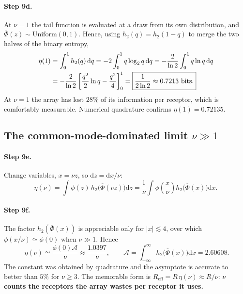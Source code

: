 \documentclass[11pt,a4paper]{article}
\newcommand{\Phibar}{\overline{\Phi}}
\newcommand{\htwo}{h_2}
\begin{document}
\paragraph{Step 9d.} At $\nu=1$ the tail function is evaluated at a draw from its own
distribution, and $\Phibar(z)\sim\mathrm{Uniform}(0,1)$. Hence, using
$\htwo(q)=\htwo(1-q)$ to merge the two halves of the binary entropy,
\begin{align}
  \eta(1)&=\int_0^1\htwo(q)\,\mathrm{d}q
         =-2\int_0^1 q\log_2 q\,\mathrm{d}q
         =-\frac{2}{\ln2}\int_0^1 q\ln q\,\mathrm{d}q \notag\\
         &=-\frac{2}{\ln2}\left[\frac{q^2}{2}\ln q-\frac{q^2}{4}\right]_0^1
          =\boxed{\frac{1}{2\ln2}\approx0.7213\ \text{bits}.}
  \label{eq:nu1}
\end{align}
At $\nu=1$ the array has lost $28\%$ of its information per receptor, which is
comfortably measurable. Numerical quadrature confirms $\eta(1)=0.72135$.

\subsection{The common-mode-dominated limit $\nu\gg1$}

\paragraph{Step 9e.} Change variables, $x=\nu z$, so $\mathrm{d}z=\mathrm{d}x/\nu$:
\begin{equation}
  \eta(\nu)=\int\phi(z)\,\htwo\big(\Phibar(\nu z)\big)\mathrm{d}z
           =\frac1\nu\int\phi\!\left(\frac{x}{\nu}\right)\htwo\big(\Phibar(x)\big)\mathrm{d}x .
\end{equation}

\paragraph{Step 9f.} The factor $\htwo(\Phibar(x))$ is appreciable only for
$|x|\lesssim4$, over which $\phi(x/\nu)\simeq\phi(0)$ when $\nu\gg1$. Hence
\begin{equation}
  \boxed{\;\eta(\nu)\simeq\frac{\phi(0)\mathcal{A}}{\nu}\approx\frac{1.0397}{\nu},
  \qquad
  \mathcal{A}=\int_{-\infty}^{\infty}\htwo\big(\Phibar(x)\big)\mathrm{d}x=2.60608 . }
  \label{eq:largenu}
\end{equation}
The constant was obtained by quadrature and the asymptote is accurate to better than
$5\%$ for $\nu\ge3$. The memorable form is $R_{\mathrm{eff}}=R\,\eta(\nu)\approx R/\nu$:
\textbf{$\nu$ counts the receptors the array wastes per receptor it uses.}
\end{document}
